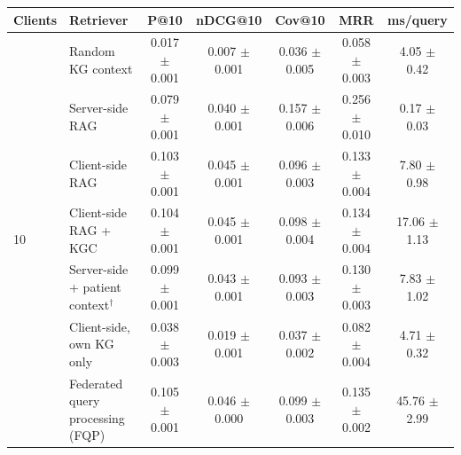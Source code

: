 \begin{tabular}{llccccc}
\toprule
Clients & Retriever & P@10 & nDCG@10 & Cov@10 & MRR & ms/query \\
\midrule
\multirow{7}{*}{10} & Random KG context & 0.017 $\pm$ 0.001 & 0.007 $\pm$ 0.001 & 0.036 $\pm$ 0.005 & 0.058 $\pm$ 0.003 & 4.05 $\pm$ 0.42 \\
 & Server-side RAG & 0.079 $\pm$ 0.001 & 0.040 $\pm$ 0.001 & 0.157 $\pm$ 0.006 & 0.256 $\pm$ 0.010 & 0.17 $\pm$ 0.03 \\
 & Client-side RAG & 0.103 $\pm$ 0.001 & 0.045 $\pm$ 0.001 & 0.096 $\pm$ 0.003 & 0.133 $\pm$ 0.004 & 7.80 $\pm$ 0.98 \\
 & Client-side RAG + KGC & 0.104 $\pm$ 0.001 & 0.045 $\pm$ 0.001 & 0.098 $\pm$ 0.004 & 0.134 $\pm$ 0.004 & 17.06 $\pm$ 1.13 \\
 & Server-side + patient context$^\dagger$ & 0.099 $\pm$ 0.001 & 0.043 $\pm$ 0.001 & 0.093 $\pm$ 0.003 & 0.130 $\pm$ 0.003 & 7.83 $\pm$ 1.02 \\
 & Client-side, own KG only & 0.038 $\pm$ 0.003 & 0.019 $\pm$ 0.001 & 0.037 $\pm$ 0.002 & 0.082 $\pm$ 0.004 & 4.71 $\pm$ 0.32 \\
 & Federated query processing (FQP) & 0.105 $\pm$ 0.001 & 0.046 $\pm$ 0.000 & 0.099 $\pm$ 0.003 & 0.135 $\pm$ 0.002 & 45.76 $\pm$ 2.99 \\
\bottomrule
\end{tabular}
